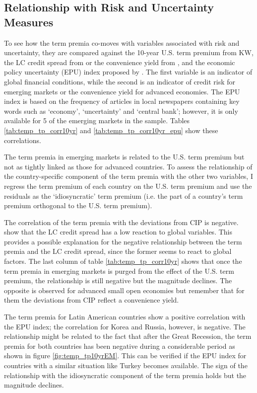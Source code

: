 \subsection{Relationship with Risk and Uncertainty Measures}
To see how the term premia co-moves with variables associated with risk and uncertainty, they are compared against the 10-year U.S. term premium from KW, the LC credit spread from \cite{DuSchreger:2016a} or the convenience yield from \cite{DuImSchreger:2018}, and the economic policy uncertainty (EPU) index proposed by \citet*{BakerBloomDavis:2016}. The first variable is an indicator of global financial conditions, while the second is an indicator of credit risk for emerging markets or the convenience yield for advanced economies. The EPU index is based on the frequency of articles in local newspapers containing key words such as `economy', `uncertainty' and `central bank'; however, it is only available for 5 of the emerging markets in the sample. Tables \ref{tab:temp_tp_corr10yr} and \ref{tab:temp_tp_corr10yr_epu} show these correlations.
%	
	
	

The term premia in emerging markets is related to the U.S. term premium but not as tightly linked as those for advanced countries. To assess the relationship of the country-specific component of the term premia with the other two variables, I regress the term premium of each country on the U.S. term premium and use the residuals as the `idiosyncratic' term premium (i.e. the part of a country's term premium orthogonal to the U.S. term premium).

The correlation of the term premia with the deviations from CIP is negative. \cite{DuSchreger:2016a} show that the LC credit spread has a low reaction to global variables. This provides a possible explanation for the negative relationship between the term premia and the LC credit spread, since the former seems to react to global factors. The last column of table \ref{tab:temp_tp_corr10yr}  shows that once the term premia in emerging markets is purged from the effect of the U.S. term premium, the relationship is still negative but the magnitude declines. The opposite is observed for advanced small open economies but remember that for them the deviations from CIP reflect a convenience yield.

The term premia for Latin American countries show a positive correlation with the EPU index; the correlation for Korea and Russia, however, is negative. The relationship might be related to the fact that after the Great Recession, the term premia for both countries has been negative during a considerable period as shown in figure \ref{fig:temp_tp10yrEM}. This can be verified if the EPU index for countries with a similar situation like Turkey becomes available. The sign of the relationship with the idiosyncratic component of the term premia holds but the magnitude declines.

